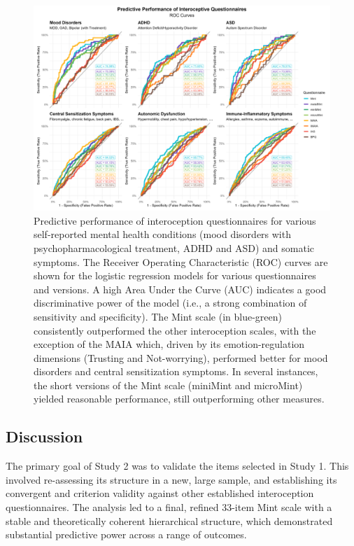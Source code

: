 \documentclass[
  jou,
  floatsintext,
  longtable,
  nolmodern,
  notxfonts,
  notimes,
  colorlinks=true,linkcolor=blue,citecolor=blue,urlcolor=blue]{apa7}
\begin{document}
\begin{figure}[!htbp]

{\caption{{Predictive performance of interoception questionnaires for
various self-reported mental health conditions (mood disorders with
psychopharmacological treatment, ADHD and ASD) and somatic symptoms. The
Receiver Operating Characteristic (ROC) curves are shown for the
logistic regression models for various questionnaires and versions. A
high Area Under the Curve (AUC) indicates a good discriminative power of
the model (i.e., a strong combination of sensitivity and specificity).
The Mint scale (in blue-green) consistently outperformed the other
interoception scales, with the exception of the MAIA which, driven by
its emotion-regulation dimensions (Trusting and Not-worrying), performed
better for mood disorders and central sensitization symptoms. In several
instances, the short versions of the Mint scale (miniMint and microMint)
yielded reasonable performance, still outperforming other
measures.}{\label{fig-six}}}}

\begin{center}
\includegraphics[width=1\linewidth,height=\textheight,keepaspectratio]{../study2/analysis/figures/fig3.png}
\end{center}

\end{figure}

\subsection{Discussion}\label{discussion-1}

The primary goal of Study 2 was to validate the items selected in Study
1. This involved re-assessing its structure in a new, large sample, and
establishing its convergent and criterion validity against other
established interoception questionnaires. The analysis led to a final,
refined 33-item Mint scale with a stable and theoretically coherent
hierarchical structure, which demonstrated substantial predictive power
across a range of outcomes.
\end{document}
